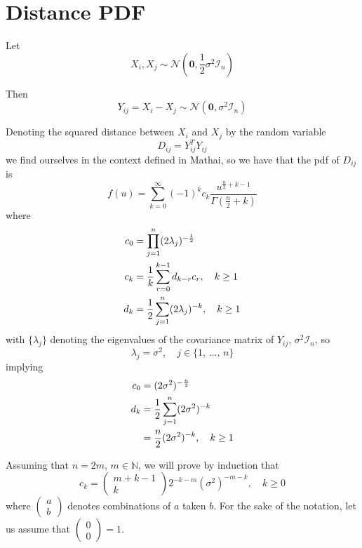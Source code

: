 \documentclass[12pt]{report}
\newcommand{\bs}{\boldsymbol}
\newcommand{\mc}[1]{\mathcal{#1}}
\newcommand{\mb}[1]{\mathbb{#1}}
\newcommand{\half}{\frac{1}{2}}
\newcommand{\sumlim}[3]{\sum\limits_{#1 = #2}^{#3}}
\newcommand{\prodlim}[3]{\prod\limits_{#1 = #2}^{#3}}
\newcommand{\comb}[2]{\begin{pmatrix}#1 \\ #2\end{pmatrix}}
\renewcommand{\bs}{\boldsymbol}
\begin{document}
\printbibliography
\appendix


\chapter{Distance PDF}
\raggedright

Let
\begin{equation*}
    X_i, X_j \sim \mathcal{N}(\bs{0}, \half\sigma^2\mc{I}_n)
\end{equation*}

Then
\begin{equation*}
    Y_{ij} = X_i - X_j \sim \mathcal{N}(\bs{0}, \sigma^2\mc{I}_n)
\end{equation*}

Denoting the squared distance between $X_i$ and $X_j$ by the random variable
\begin{equation*}
    D_{ij} = Y_{ij}^TY_{ij}
\end{equation*}
we find ourselves in the context defined in Mathai, so we have that the pdf of $D_{ij}$ is
\begin{equation*}
    f(u) = \sumlim{k}{0}{\infty}(-1)^kc_k\frac{u^{\frac{n}{2}+k-1}}{\Gamma(\frac{n}{2}+k)}
\end{equation*}
where
\begin{align}
    c_0 &= \prodlim{j}{1}{n}(2\lambda_j)^{-\half} \notag\\
    c_k &= \frac{1}{k}\sumlim{r}{0}{k-1}d_{k-r}c_r,\quad k\geq1 \\
    d_k &= \half\sumlim{j}{1}{n}(2\lambda_j)^{-k},\quad k\geq1 \notag
\end{align}
with $\{\lambda_j\}$ denoting the eigenvalues of the covariance matrix of $Y_{ij}$, $\sigma^2\mathcal{I}_n$, so
\begin{equation*}
    \lambda_j = \sigma^2,\quad j\in\{1,\,\dots,\,n\}
\end{equation*}
implying
\begin{align}
    c_0 &= (2\sigma^2)^{-\frac{n}{2}} \\
    d_k &= \half\sumlim{j}{1}{n}(2\sigma^2)^{-k} \notag\\
        &= \frac{n}{2}(2\sigma^2)^{-k},\quad k\geq1
\end{align}

Assuming that $n = 2m,\,m\in\mb{N}$, we will prove by induction that
\begin{equation*}
    c_k = \comb{m + k - 1}{k}2^{-k-m}(\sigma^2)^{-m - k},\quad k \geq 0
\end{equation*}
where $\comb{a}{b}$ denotes combinations of $a$ taken $b$. For the sake of the notation, let us assume that $\comb{0}{0} = 1$. \\
\end{document}

